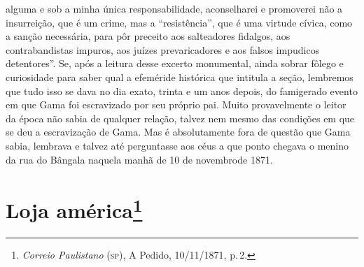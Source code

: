 \begin{argumento}
{alguma e sob a minha única responsabilidade, aconselharei e promoverei
não a insurreição, que é um crime, mas a ``resistência'', que é uma
virtude cívica, como a sanção necessária, para pôr preceito aos
salteadores fidalgos, aos contrabandistas impuros, aos juízes
prevaricadores e aos falsos impudicos detentores''. Se, após a leitura
desse excerto monumental, ainda sobrar fôlego e curiosidade para saber
qual a efeméride histórica que intitula a seção, lembremos que tudo isso
se dava no dia exato, trinta e um anos depois, do famigerado evento em
que Gama foi escravizado por seu próprio pai. Muito provavelmente o
leitor da época não sabia de qualquer relação, talvez nem mesmo das
condições em que se deu a escravização de Gama. Mas é absolutamente fora
de questão que Gama sabia, lembrava e talvez até perguntasse aos céus a
que ponto chegava o menino da rua do Bângala naquela manhã de 10 de
novembrode 1871.}
\end{argumento}

\chapter{Loja américa\footnote{\emph{Correio Paulistano} (\textsc{sp}), A Pedido, 10/11/1871,
  p.\,2.}} %


